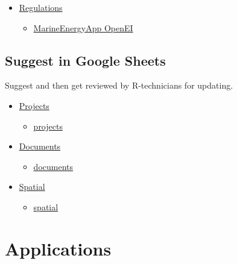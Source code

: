 \documentclass[
]{book}
\providecommand{\tightlist}{%
  \setlength{\itemsep}{0pt}\setlength{\parskip}{0pt}}
\begin{document}
\begin{itemize}
\tightlist
\item
  \href{https://marineenergy.app/regs.html}{Regulations}

  \begin{itemize}
  \tightlist
  \item
    \href{https://openei.org/wiki/MarineEnergyApp}{MarineEnergyApp \textbar{} OpenEI}
  \end{itemize}
\end{itemize}

\hypertarget{suggest-in-google-sheets}{%
\section{Suggest in Google Sheets}\label{suggest-in-google-sheets}}

Suggest and then get reviewed by R-technicians for updating.

\begin{itemize}
\tightlist
\item
  \href{https://marineenergy.app/projects.html}{Projects}

  \begin{itemize}
  \tightlist
  \item
    \href{https://docs.google.com/spreadsheets/d/1HC5hXyi2RQSHevnV7rvyk748U5-X3iUw70ewHEfrHm0/edit\#gid=793817660}{projects}
  \end{itemize}
\item
  \href{https://marineenergy.app/ferc.html}{Documents}

  \begin{itemize}
  \tightlist
  \item
    \href{https://docs.google.com/spreadsheets/d/1c9pFSkQyQvLFpyMT4KlBoSFA_wtJ_iNj8YmNX_RZmXc/edit\#gid=951079264}{documents}
  \end{itemize}
\item
  \href{https://shiny.marineenergy.app/report/?nav=Spatial}{Spatial}

  \begin{itemize}
  \tightlist
  \item
    \href{https://docs.google.com/spreadsheets/d/1MMVqPr39R5gAyZdY2iJIkkIdYqgEBJYQeGqDk1z-RKQ/edit\#gid=936111013}{spatial}
  \end{itemize}
\end{itemize}

\hypertarget{applications}{%
\chapter{Applications}\label{applications}}
\end{document}

